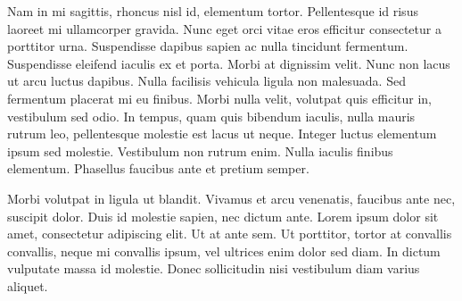 \documentclass[11pt,a4paper,roman]{moderncv}        %
\begin{document}
Nam in mi sagittis, rhoncus nisl id, elementum tortor. Pellentesque id risus laoreet mi ullamcorper gravida. Nunc eget orci vitae eros efficitur consectetur a porttitor urna. Suspendisse dapibus sapien ac nulla tincidunt fermentum. Suspendisse eleifend iaculis ex et porta. Morbi at dignissim velit. Nunc non lacus ut arcu luctus dapibus. Nulla facilisis vehicula ligula non malesuada. Sed fermentum placerat mi eu finibus. Morbi nulla velit, volutpat quis efficitur in, vestibulum sed odio. In tempus, quam quis bibendum iaculis, nulla mauris rutrum leo, pellentesque molestie est lacus ut neque. Integer luctus elementum ipsum sed molestie. Vestibulum non rutrum enim. Nulla iaculis finibus elementum. Phasellus faucibus ante et pretium semper.

Morbi volutpat in ligula ut blandit. Vivamus et arcu venenatis, faucibus ante nec, suscipit dolor. Duis id molestie sapien, nec dictum ante. Lorem ipsum dolor sit amet, consectetur adipiscing elit. Ut at ante sem. Ut porttitor, tortor at convallis convallis, neque mi convallis ipsum, vel ultrices enim dolor sed diam. In dictum vulputate massa id molestie. Donec sollicitudin nisi vestibulum diam varius aliquet.



\vspace{0.5cm}


\makeletterclosing
\end{document}
